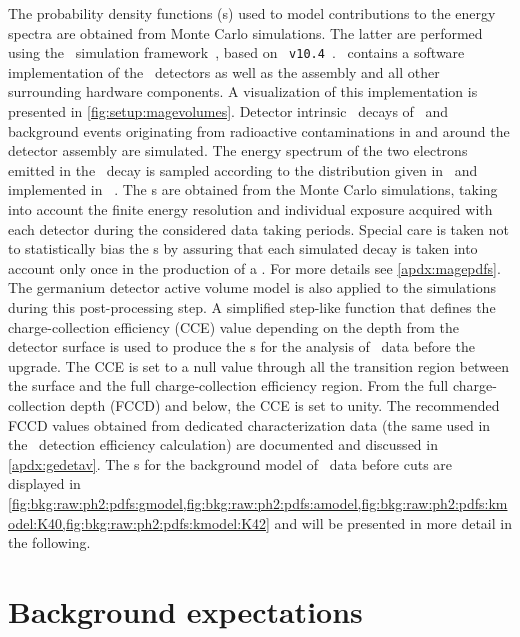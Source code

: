 The probability density functions (\pdf{}s) used to model contributions to the energy spectra
are obtained from Monte Carlo simulations. The latter are performed using the \mage\
simulation framework~\cite{Boswell2011}, based on
\geant~\texttt{v10.4}~\cite{Agostinelli2002, Allison2006, Allison2016}.  \mage\ contains a
software implementation of the \gerdatwo\ detectors as well as the assembly and all other
surrounding hardware components. A visualization of this implementation is presented in
\cref{fig:setup:magevolumes}. Detector intrinsic \nnbb\ decays of \gesix\ and background
events originating from radioactive contaminations in and around the detector assembly are
simulated. The energy spectrum of the two electrons emitted in the \nnbb\ decay is
sampled according to the distribution given in~\cite{Tretyak1995} and implemented in
\decayzero~\cite{Ponkratenko2000}. The \pdf{}s are obtained from the Monte Carlo simulations,
taking into account the finite energy resolution and individual exposure acquired with
each detector during the considered data taking periods. Special care is taken not to
statistically bias the \pdf{}s by assuring that each simulated decay is taken into account
only once in the production of a \pdf. For more details see \cref{apdx:magepdfs}. The
germanium detector active volume model is also applied to the simulations during this
post-processing step. A simplified step-like function that defines the charge-collection
efficiency (CCE) value depending on the depth from the detector surface is used to produce
the \pdf{}s for the analysis of \phasetwo\ data before the upgrade. The CCE is set to a null
value through all the transition region between the surface and the full charge-collection
efficiency region. From the full charge-collection depth (FCCD) and below, the CCE is set
to unity. The recommended FCCD values obtained from dedicated characterization data
(the same used in the \onbb\ detection efficiency calculation) are documented and
discussed in \cref{apdx:gedetav}. The \pdf{}s for the background model of \gerdatwo\ data
before cuts are displayed in
\cref{fig:bkg:raw:ph2:pdfs:gmodel,fig:bkg:raw:ph2:pdfs:amodel,fig:bkg:raw:ph2:pdfs:kmodel:K40,fig:bkg:raw:ph2:pdfs:kmodel:K42}
and will be presented in more detail in the following.

\section{Background expectations}%
\label{sec:bkg:raw:ph2:priors}

